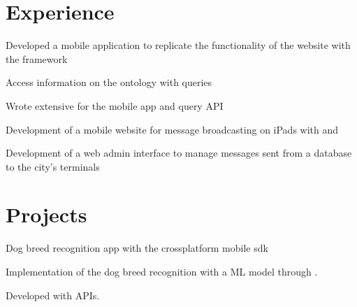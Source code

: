 \documentclass[]{deedy-resume-openfont}
\begin{document}
\begin{minipage}[t]{0.66\textwidth} 

\section{Experience}

\hfill
\hfill

\begin{tightemize}
\item Developed a mobile application to replicate the functionality of the website with the  framework
\item Access information on the ontology with  queries
\item Wrote extensive  for the mobile app and query API
\end{tightemize}
\sectionsep

\begin{tightemize}
\item Development of a mobile website for message broadcasting on iPads with  and 
\item Development of a web admin interface to manage messages sent from a database to the city’s terminals
\end{tightemize}
\sectionsep


\section{Projects}
\begin{tightemize}
\item Dog breed recognition app with the  crossplatform mobile sdk
\item Implementation of the dog breed recognition with a ML model through .
\item Developed with  APIs.
\end{tightemize}
\sectionsep


\end{minipage}
\end{document}
